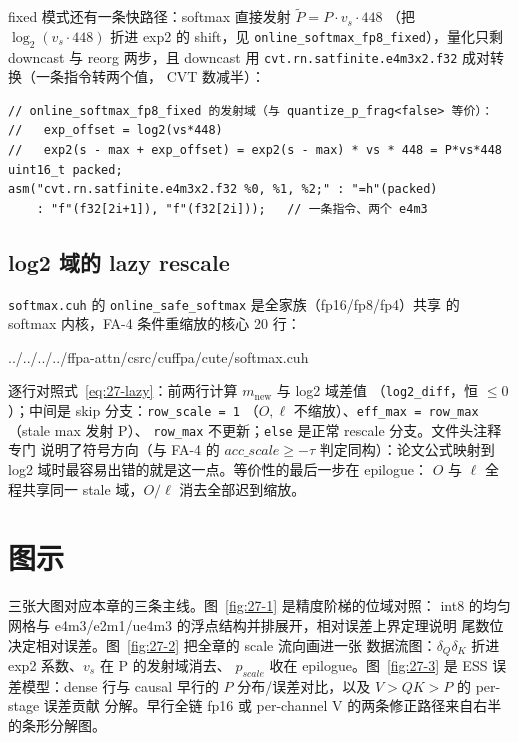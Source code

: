 fixed 模式还有一条快路径：softmax 直接发射 $\tilde{P} = P \cdot v_s \cdot 448$
（把 $\log_2(v_s \cdot 448)$ 折进 exp2 的 shift，见
\texttt{online\_softmax\_fp8\_fixed}），量化只剩 downcast 与 reorg 两步，且 downcast
用 \texttt{cvt.rn.satfinite.e4m3x2.f32} 成对转换（一条指令转两个值，
CVT 数减半）：
\begin{lstlisting}[style=pseudo]
// online_softmax_fp8_fixed 的发射域（与 quantize_p_frag<false> 等价）：
//   exp_offset = log2(vs*448)
//   exp2(s - max + exp_offset) = exp2(s - max) * vs * 448 = P*vs*448
uint16_t packed;
asm("cvt.rn.satfinite.e4m3x2.f32 %0, %1, %2;" : "=h"(packed)
    : "f"(f32[2i+1]), "f"(f32[2i]));   // 一条指令、两个 e4m3
\end{lstlisting}

\subsection{log2 域的 lazy rescale}

\texttt{softmax.cuh} 的 \texttt{online\_safe\_softmax} 是全家族（fp16/fp8/fp4）共享
的 softmax 内核，FA-4 条件重缩放的核心 20 行：


  {../../../../ffpa-attn/csrc/cuffpa/cute/softmax.cuh}

逐行对照式~\ref{eq:27-lazy}：前两行计算 $m_{\mathrm{new}}$ 与 log2 域差值
（\texttt{log2\_diff}，恒 $\le 0$）；中间是 skip 分支：\texttt{row\_scale = 1}
（$O,\ell$ 不缩放）、\texttt{eff\_max = row\_max}（stale max 发射 P）、
\texttt{row\_max} 不更新；\texttt{else} 是正常 rescale 分支。文件头注释专门
说明了符号方向（与 FA-4 的 $acc\_scale \ge -\tau$ 判定同构）：论文公式映射到
log2 域时最容易出错的就是这一点。等价性的最后一步在 epilogue：
$O$ 与 $\ell$ 全程共享同一 stale 域，$O/\ell$ 消去全部迟到缩放。

\section{图示}

三张大图对应本章的三条主线。图~\ref{fig:27-1} 是精度阶梯的位域对照：
int8 的均匀网格与 e4m3/e2m1/ue4m3 的浮点结构并排展开，相对误差上界定理说明
尾数位决定相对误差。图~\ref{fig:27-2} 把全章的 scale 流向画进一张
数据流图：$\delta_Q\delta_K$ 折进 exp2 系数、$v_s$ 在 P 的发射域消去、
$p_{scale}$ 收在 epilogue。图~\ref{fig:27-3} 是 ESS 误差模型：dense 行与
causal 早行的 $P$ 分布/误差对比，以及 $V>QK>P$ 的 per-stage 误差贡献
分解。早行全链 fp16 或 per-channel V 的两条修正路径来自右半的条形分解图。

